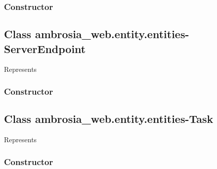 \documentclass[letterpaper,10pt,english]{sphinxmanual}
\begin{document}
\subsubsection{Constructor}
\label{ambrosia_web.entity.entities-File:constructor}

\begin{fulllineitems}
\label{ambrosia_web.entity.entities-File:ambrosia_web.entity.entities-File}
\end{fulllineitems}



\subsection{Class ambrosia\_web.entity.entities-ServerEndpoint}
\label{ambrosia_web.entity.entities-ServerEndpoint:class-ambrosia-web-entity-entities-serverendpoint}\label{ambrosia_web.entity.entities-ServerEndpoint::doc}
Represents {\hyperref[ambrosia.model:ambrosia.model.entities.ServerEndpoint]{}}


\subsubsection{Constructor}
\label{ambrosia_web.entity.entities-ServerEndpoint:constructor}

\begin{fulllineitems}
\label{ambrosia_web.entity.entities-ServerEndpoint:ambrosia_web.entity.entities-ServerEndpoint}
\end{fulllineitems}



\subsection{Class ambrosia\_web.entity.entities-Task}
\label{ambrosia_web.entity.entities-Task:class-ambrosia-web-entity-entities-task}\label{ambrosia_web.entity.entities-Task::doc}
Represents {\hyperref[ambrosia.model:ambrosia.model.entities.Task]{}}


\subsubsection{Constructor}
\label{ambrosia_web.entity.entities-Task:constructor}
\end{document}
